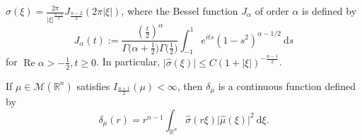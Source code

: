 \begin{lemma}\label{lem:5.3}
$\displaystyle \hat{\sigma}(\xi)= \frac{2\pi}{\lvert \xi \rvert^{\frac{n-2}{2}}}J_{\frac{n-2}{2}}(2\pi \lvert \xi \rvert)$, where the Bessel function $J_{\alpha}$ of order $\alpha$ is defined by
$$
J_{\alpha}(t):= \frac{\left( \frac{t}{2} \right)^{\alpha}}{\Gamma\big( \alpha+\frac{1}{2} \big)\Gamma\big( \frac{1}{2} \big)}\int _{-1}^{1}e^{its}(1-s^{2})^{\alpha-1/2}\ \mathrm{d}s
$$
for $\operatorname{Re}\alpha>-\frac{1}{2}, t\geq {0}$.
In particular, $\lvert \hat{\sigma}(\xi) \rvert\leq C(1+\lvert \xi \rvert)^{-\frac{n-1}{2}}$.
\end{lemma}

\begin{lemma}\label{lem:5.4}
If $\mu \in \mathcal{M}(\mathbb{R}^{n})$ satisfies $I_{\frac{n+1}{2}}(\mu)<\infty$, then $\delta _{\mu}$ is a continuous function defined by
$$
\delta _{\mu}(r)=r^{n-1}\int _{\mathbb{R}^{n}}\hat{\sigma}(r\xi)\lvert \hat{\mu}(\xi) \rvert ^{2}\ \mathrm{d}\xi.
$$
\end{lemma}
